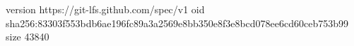 version https://git-lfs.github.com/spec/v1
oid sha256:83303f553bdb6ae196fc89a3a2569e8bb350e8f3e8bcd078ee6cd60ceb753b99
size 43840
